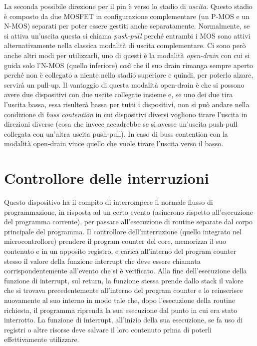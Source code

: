 \documentclass[12pt, a4paper]{report}
\begin{document}
La seconda possibile direzione per il pin è verso lo stadio di \textit{uscita}. Questo stadio è composto da due MOSFET in configurazione complementare (un P-MOS e un N-MOS) separati per poter essere gestiti anche separatamente. Normalmente, se si attiva un'uscita questa si chiama \textit{push-pull} perché entrambi i MOS sono attivi alternativamente nella classica modalità di uscita complementare. Ci sono però anche altri modi per utilizzarli, uno di questi è la modalità \textit{open-drain} con cui si guida solo l'N-MOS (quello inferiore) così che il suo drain rimanga sempre aperto perché non è collegato a niente nello stadio superiore e quindi, per poterlo alzare, servirà un pull-up. Il vantaggio di questa modalità open-drain è che si possono avere due dispositivi con due uscite collegate insieme e, se uno dei due tira l'uscita bassa, essa risulterà bassa per tutti i dispositivi, non si può andare nella condizione di \textit{buss contention} in cui dispositivi diversi vogliono tirare l'uscita in direzioni diverse (cosa che invece accadrebbe se si avesse un'uscita push-pull collegata con un'altra uscita push-pull). In caso di buss contention con la modalità open-drain vince quello che vuole tirare l'uscita verso il basso.

\section{Controllore delle interruzioni}
Questo dispositivo ha il compito di interrompere il normale flusso di programmazione, in risposta ad un certo evento (asincrono rispetto all'esecuzione del programma corrente), per passare all'esecuzione di routine separate dal corpo principale del programma. Il controllore dell'interruzione (quello integrato nel microcontrollore) prendere il program counter del core, memorizza il suo contenuto e in un apposito registro, e carica all'interno del program counter stesso il valore della funzione interrupt che deve essere chiamata corrispondentemente all'evento che si è verificato. Alla fine dell'esecuzione della funzione di interrupt, sul return, la funzione stessa prende dallo stack il valore che si trovava precedentemente all'interno del program counter e lo reinserisce nuovamente al suo interno in modo tale che, dopo l'esecuzione della routine richiesta, il programma riprenda la sua esecuzione dal punto in cui era stato interrotto. La funzione di interrupt, all'inizio della sua esecuzione, se fa uso di registri o altre risorse deve salvare il loro contenuto prima di poterli effettivamente utilizzare.
\end{document}
